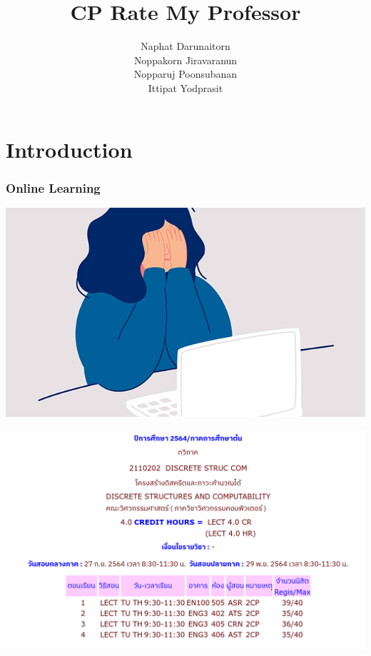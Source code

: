 \documentclass[aspectratio=169]{beamer}
\title{CP Rate My Professor}
\author[CP Rate My Professor Team]{Naphat Darunaitorn\\ Noppakorn Jiravaranun\\ Nopparuj Poonsubanan\\ Ittipat Yodprasit}
\begin{document}
\frame{\titlepage}
\section{Introduction}
\begin{frame}
    \frametitle{Online Learning}
    \centering
    \includegraphics[scale=0.5]{online_learning.jpg}
\end{frame}
\begin{frame}
    \centering
    \includegraphics[scale=0.4]{discrete_section.png}
\end{frame}
\end{document}
